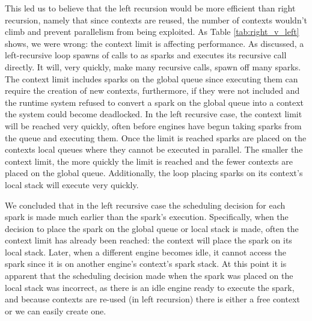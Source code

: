 This led us to believe that the left recursion would be more efficient than
right recursion,
namely that since contexts are reused, the number of contexts wouldn't climb
and prevent parallelism from being exploited.
As Table \ref{tab:right_v_left} shows, we were wrong:
the context limit is affecting performance.
As discussed, a left-recursive loop spawns of calls to  as sparks
and executes its recursive call directly.
It will, very quickly,
make many recursive calls, spawn off many sparks.
The context limit includes sparks on the global queue since
executing them can require the creation of new contexts,
furthermore, if they were not included and the runtime system refused to
convert a spark on the global queue into a context the system could become
deadlocked.
In the left recursive case,
the context limit will be reached very quickly,
often before engines have begun taking sparks from the queue and executing
them.
Once the limit is reached sparks are placed on the contexts local queues
where they cannot be executed in parallel.
The smaller the context limit,
the more quickly the limit is reached and the fewer contexts are placed on
the global queue.
Additionally,
the loop placing sparks on its context's local stack will execute very
quickly.

We concluded that
in the left recursive case
the scheduling decision for each spark is made much earlier than the spark's
execution.
Specifically,
when the decision to place the spark on the global queue or local stack is
made,
often the context limit has already been reached:
the context will place the spark on its local stack.
Later, when a different engine becomes idle,
it cannot access the spark since it is on another engine's context's spark
stack.
At this point it is apparent that the scheduling decision made when the
spark was placed on the local stack was incorrect,
as there is an idle engine ready to execute the spark,
and because contexts are re-used (in left recursion) there is either a free
context or we can easily create one.

